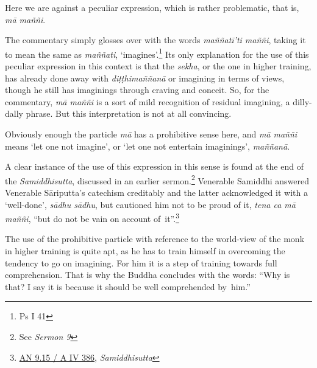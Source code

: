 Here we are against a peculiar expression, which is rather problematic, that is, \emph{mā maññi}.

The commentary simply glosses over with the words \emph{maññatī'ti maññi}, taking it to mean the same as \emph{maññati}, `imagines'.\footnote{Ps I 41} Its only explanation for the use of this peculiar expression in this context is that the \emph{sekha}, or the one in higher training, has already done away with \emph{diṭṭhimaññanā} or imagining in terms of views, though he still has imaginings through craving and conceit. So, for the commentary, \emph{mā maññi} is a sort of mild recognition of residual imagining, a dilly-dally phrase. But this interpretation is not at all convincing.

Obviously enough the particle \emph{mā} has a prohibitive sense here, and \emph{mā maññi} means `let one not imagine', or `let one not entertain imaginings', \emph{maññanā}.

A clear instance of the use of this expression in this sense is found at the end of the \emph{Samiddhisutta}, discussed in an earlier sermon.\footnote{See \emph{Sermon 9}} Venerable Samiddhi answered Venerable Sāriputta's catechism creditably and the latter acknowledged it with a `well-done', \emph{sādhu sādhu}, but cautioned him not to be proud of it, \emph{tena ca mā maññi}, ``but do not be vain on account of~it''.\footnote{\href{https://suttacentral.net/an9.15/pli/ms}{AN 9.15 / A IV 386}, \emph{Samiddhisutta}}

The use of the prohibitive particle with reference to the world-view of the monk in higher training is quite apt, as he has to train himself in overcoming the tendency to go on imagining. For him it is a step of training towards full comprehension. That is why the Buddha concludes with the words: ``Why is that? I say it is because it should be well comprehended by~him.''
